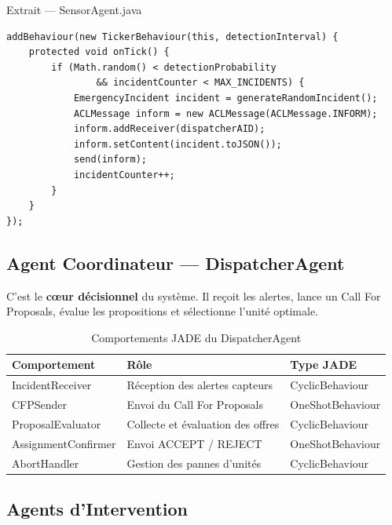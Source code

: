 \documentclass[12pt, a4paper]{report}
\begin{document}
\begin{codebox}{Extrait — SensorAgent.java}
\begin{lstlisting}
addBehaviour(new TickerBehaviour(this, detectionInterval) {
    protected void onTick() {
        if (Math.random() < detectionProbability
                && incidentCounter < MAX_INCIDENTS) {
            EmergencyIncident incident = generateRandomIncident();
            ACLMessage inform = new ACLMessage(ACLMessage.INFORM);
            inform.addReceiver(dispatcherAID);
            inform.setContent(incident.toJSON());
            send(inform);
            incidentCounter++;
        }
    }
});
\end{lstlisting}
\end{codebox}

\subsection{Agent Coordinateur — DispatcherAgent}

C'est le \textbf{c\oe{}ur décisionnel} du système. Il reçoit les alertes, lance un
Call For Proposals, évalue les propositions et sélectionne l'unité optimale.

\begin{table}[H]
\centering
\caption{Comportements JADE du DispatcherAgent}
\begin{tabularx}{\textwidth}{lXl}
\toprule
\rowcolor{NavyCard!15}
\color{CyanNeon}Comportement & \color{CyanNeon}Rôle & \color{CyanNeon}Type JADE \\
\midrule
IncidentReceiver    & Réception des alertes capteurs     & CyclicBehaviour \\
CFPSender           & Envoi du Call For Proposals        & OneShotBehaviour \\
ProposalEvaluator   & Collecte et évaluation des offres  & CyclicBehaviour \\
AssignmentConfirmer & Envoi ACCEPT / REJECT              & OneShotBehaviour \\
AbortHandler        & Gestion des pannes d'unités        & CyclicBehaviour \\
\bottomrule
\end{tabularx}
\end{table}

\subsection{Agents d'Intervention}
\end{document}
